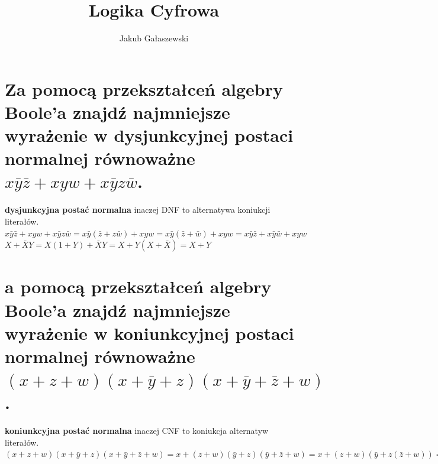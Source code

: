 \documentclass{article}
\title{Logika Cyfrowa}
\author{Jakub Gałaszewski}
\begin{document}
\maketitle
\section{ Za pomocą przekształceń algebry Boole’a znajdź najmniejsze wyrażenie w dysjunkcyjnej postaci normalnej równoważne $x\bar{y}\bar{z} + xyw + x\bar{y}z\bar{w}$.}
 \textbf{dysjunkcyjna postać normalna} inaczej DNF to alternatywa koniukcji literałów.\\
 $x\bar{y}\bar{z} + xyw + x\bar{y}z\bar{w}=x\bar{y}(\bar{z}+z\bar{w}) + xyw=x\bar{y}(\bar{z}+\bar{w}) + xyw = x\bar{y}\bar{z} + x\bar{y}\bar{w} + xyw$\\
 $X+\bar{X}Y = X(1+Y)+ \bar{X}Y = X + Y(X + \bar{X})=X+Y$
\section{a pomocą przekształceń algebry Boole’a znajdź najmniejsze wyrażenie w koniunkcyjnej postaci normalnej równoważne $(x + z + w)(x + \bar y + z)(x + \bar y + \bar z + w)$.}
 \textbf{koniunkcyjna postać normalna} inaczej CNF to koniukcja alternatyw literałów.\\
 $(x + z + w)(x + \bar y + z)(x + \bar y + \bar z + w) = x+(z + w)(\bar y + z)(\bar y + \bar z + w) = x+(z + w) (\bar y + z(\bar z + w)) =x+(z + w)(\bar y + zw)  = x+(z + w)(\bar y + z)(\bar y + w) = (x+z + w)(x + \bar y + z)(x + \bar y + w)$
\end{document}
